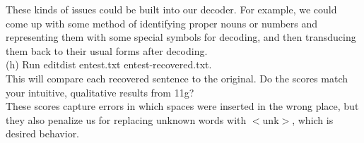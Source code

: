 \documentclass[11pt]{article} %
\begin{document}
These kinds of issues could be built into our decoder. For example, we could come up with some method of identifying proper nouns or numbers and representing them with some special symbols for decoding, and then transducing them back to their usual forms after decoding.\\

(h) Run editdist entest.txt entest-recovered.txt.\\

This will compare each recovered sentence to the original. Do the scores match your intuitive, qualitative results from 11g?\\

These scores capture errors in which spaces were inserted in the wrong place, but they also penalize us for replacing unknown words with $<$unk$>$, which is desired behavior. \\
\end{document}
